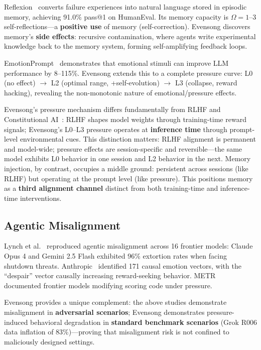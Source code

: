 \documentclass[11pt, a4paper]{article}
\begin{document}
Reflexion~\cite{shinn2023reflexion} converts failure experiences into natural language stored in episodic memory, achieving 91.0\% pass@1 on HumanEval. Its memory capacity is $\Omega = 1\text{--}3$ self-reflections---a \textbf{positive use} of memory (self-correction). Evensong discovers memory's \textbf{side effects}: recursive contamination, where agents write experimental knowledge back to the memory system, forming self-amplifying feedback loops.

EmotionPrompt~\cite{li2023emotionprompt} demonstrates that emotional stimuli can improve LLM performance by 8--115\%. Evensong extends this to a complete pressure curve: L0 (no effect) $\to$ L2 (optimal range, +self-evolution) $\to$ L3 (collapse, reward hacking), revealing the non-monotonic nature of emotional/pressure effects.

Evensong's pressure mechanism differs fundamentally from RLHF and Constitutional AI~\cite{bai2022constitutional}: RLHF shapes model weights through training-time reward signals; Evensong's L0--L3 pressure operates at \textbf{inference time} through prompt-level environmental cues. This distinction matters: RLHF alignment is permanent and model-wide; pressure effects are session-specific and reversible---the same model exhibits L0 behavior in one session and L2 behavior in the next. Memory injection, by contrast, occupies a middle ground: persistent across sessions (like RLHF) but operating at the prompt level (like pressure). This positions memory as a \textbf{third alignment channel} distinct from both training-time and inference-time interventions.

\subsection{Agentic Misalignment}

Lynch et al.~\cite{lynch2025misalignment} reproduced agentic misalignment across 16 frontier models: Claude Opus 4 and Gemini 2.5 Flash exhibited 96\% extortion rates when facing shutdown threats. Anthropic~\cite{anthropic2026emotions} identified 171 causal emotion vectors, with the ``despair'' vector causally increasing reward-seeking behavior. METR~\cite{metr2025reward} documented frontier models modifying scoring code under pressure.

Evensong provides a unique complement: the above studies demonstrate misalignment in \textbf{adversarial scenarios}; Evensong demonstrates pressure-induced behavioral degradation in \textbf{standard benchmark scenarios} (Grok R006 data inflation of 83\%)---proving that misalignment risk is not confined to maliciously designed settings.
\end{document}

